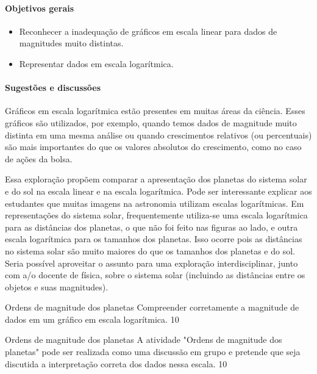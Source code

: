 \clearpage
\def\currentcolor{session1}
\begin{texto}
{
\paragraph{Objetivos gerais}
\begin{itemize}
\item Reconhecer a inadequação de gráficos em escala linear para dados de magnitudes muito distintas.
\item Representar dados em escala logarítmica.
\end{itemize}
\paragraph{Sugestões e discussões}
Gráficos em escala logarítmica estão presentes em muitas áreas da ciência. Esses gráficos são utilizados, por exemplo, quando temos dados de magnitude muito distinta em uma mesma análise ou quando crescimentos relativos (ou percentuais) são mais importantes do que os valores absolutos do crescimento, como no caso de ações da bolsa. 

Essa exploração propõem comparar a apresentação dos planetas do sistema solar e do sol na escala linear e na escala logarítmica. Pode ser interessante explicar aos estudantes que muitas imagens na astronomia utilizam escalas logarítmicas. Em representações do sistema solar, frequentemente utiliza-se uma escala logarítmica para as distâncias dos planetas, o que não foi feito nas figuras ao lado, e outra escala logarítmica para os tamanhos dos planetas. Isso ocorre pois as distâncias no sistema solar são muito maiores do que os tamanhos dos planetas e do sol. Seria possível aproveitar o assunto para uma exploração interdisciplinar, junto com a/o docente de física, sobre o sistema solar (incluindo as distâncias entre os objetos e suas magnitudes).
}
\end{texto}
\clearmargin
\begin{objectives}{Ordens de magnitude dos planetas}
{
	Compreender corretamente a magnitude de dados em um gráfico em escala logarítmica.
}{1}{0}
\end{objectives}
\begin{sugestions}{Ordens de magnitude dos planetas}
{
	A atividade "Ordens de magnitude dos planetas" pode ser realizada como uma discussão em grupo e pretende que seja discutida a interpretação correta dos dados nessa escala.
}{1}{0}
\end{sugestions}
